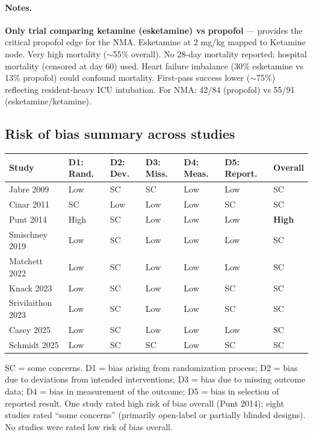 \documentclass[11pt]{article}
\begin{document}
\paragraph{Notes.}
\textbf{Only trial comparing ketamine (esketamine) vs propofol} --- provides the critical propofol edge for the NMA. Esketamine at 2 mg/kg mapped to Ketamine node. Very high mortality ($\sim$55\% overall). No 28-day mortality reported; hospital mortality (censored at day 60) used. Heart failure imbalance (30\% esketamine vs 13\% propofol) could confound mortality. First-pass success lower ($\sim$75\%) reflecting resident-heavy ICU intubation. For NMA: 42/84 (propofol) vs 55/91 (esketamine/ketamine).

\newpage

\subsection{Risk of bias summary across studies}

\begin{table}[H]
\centering
\small
\begin{tabularx}{\textwidth}{L{2.5cm} C{1.4cm} C{1.4cm} C{1.4cm} C{1.4cm} C{1.4cm} C{1.6cm}}
\toprule
\textbf{Study} & \textbf{D1: Rand.} & \textbf{D2: Dev.} & \textbf{D3: Miss.} & \textbf{D4: Meas.} & \textbf{D5: Report.} & \textbf{Overall} \\
\midrule
Jabre 2009 & Low & SC & SC & Low & Low & SC \\
Cinar 2011 & SC & Low & Low & Low & SC & SC \\
Punt 2014 & High & SC & Low & Low & Low & \textbf{High} \\
Smischney 2019 & Low & SC & Low & Low & Low & SC \\
Matchett 2022 & Low & SC & Low & Low & Low & SC \\
Knack 2023 & Low & SC & Low & Low & SC & SC \\
Srivilaithon 2023 & Low & SC & Low & Low & SC & SC \\
Casey 2025 & Low & SC & Low & Low & Low & SC \\
Schmidt 2025 & Low & SC & SC & Low & SC & SC \\
\bottomrule
\end{tabularx}
\vspace{4pt}
\raggedright\footnotesize
SC = some concerns. D1 = bias arising from randomization process; D2 = bias due to deviations from intended interventions; D3 = bias due to missing outcome data; D4 = bias in measurement of the outcome; D5 = bias in selection of reported result. One study rated high risk of bias overall (Punt 2014); eight studies rated ``some concerns'' (primarily open-label or partially blinded designs). No studies were rated low risk of bias overall.
\end{table}
\end{document}
